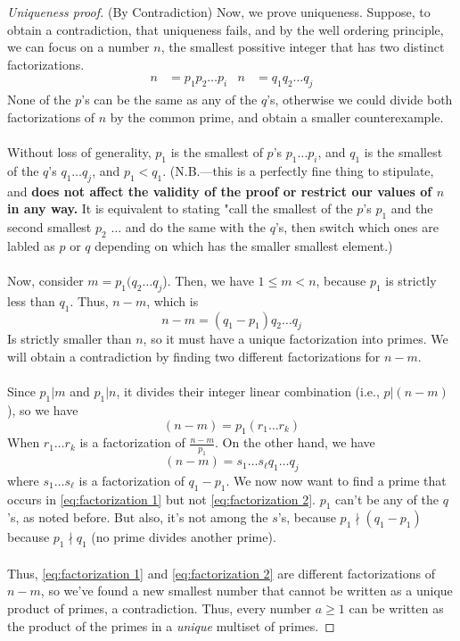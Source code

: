 \documentclass[10pt]{article}
\theoremstyle{definition}
\begin{document}
\begin{proof}[Uniqueness proof](By Contradiction) Now, we prove uniqueness.  Suppose, to obtain a contradiction, that uniqueness fails, and by the well ordering principle, we can focus on a number $n$, the smallest possitive integer that has two distinct factorizations. 
\begin{align*}
n &= p_1 p_2 \ldots p_i & n&= q_1 q_2 \ldots q_j 
\end{align*}
None of the $p$'s can be the same as any of the $q$'s, otherwise we could divide both factorizations of $n$ by the common prime, and obtain a smaller counterexample.  \\~\\
Without loss of generality, $p_1$ is the smallest of $p$'s $p_1\ldots p_i$, and $q_1$ is the smallest of the $q$'s $q_1\ldots q_j$, and $p_1<q_1$.  (N.B.---this is a perfectly fine thing to stipulate, and \textbf{does not affect the validity of the proof or restrict our values of $n$ in any way.}  It is equivalent to stating "call the smallest of the $p$'s $p_1$ and the second smallest $p_2$ $\ldots$ and do the same with the $q$'s, then switch which ones are labled as $p$ or $q$ depending on which has the smaller smallest element.)  \\~\\
Now, consider $m=p_1(q_2\ldots q_j$).  Then, we have $1\leq m < n$, because $p_1$ is strictly less than $q_1$. Thus, $n-m$, which is 
\[n-m = (q_1-p_1)q_2\ldots q_j\]
Is strictly smaller than $n$, so it must have a unique factorization into primes.  We will obtain a contradiction by finding two different factorizations for $n-m$.\\~\\
Since $p_1|m$ and $p_1|n$, it divides their integer linear combination (i.e., $p|(n-m)$), so we have 
\begin{equation}\label{eq:factorization 1}
(n-m) = p_1(r_1\ldots r_k)
\end{equation}
When $r_1\ldots r_k$ is a factorization of $\frac{n-m}{p_1}$.  On the other hand, we have 
\begin{equation}\label{eq:factorization 2}
(n-m) = s_1\ldots s_\ell q_1\ldots q_j
\end{equation}
where $s_1\ldots s_\ell$ is a factorization of $q_1-p_1$.  We now now want to find a prime that occurs in \ref{eq:factorization 1} but not \ref{eq:factorization 2}.  $p_1$ can't be any of the $q$'s, as noted before.  But also, it's not among the $s$'s, because $p_1 \nmid (q_1-p_1)$ because $p_1\nmid q_1$ (no prime divides another prime).  \\~\\
Thus, \ref{eq:factorization 1} and \ref{eq:factorization 2} are different factorizations of $n-m$, so we've found a new smallest number that cannot be written as a unique product of primes, a contradiction.  Thus, every number $a\geq 1$ can be written as the product of the primes in a \textit{unique} multiset of primes.
\end{proof}
\end{document}
